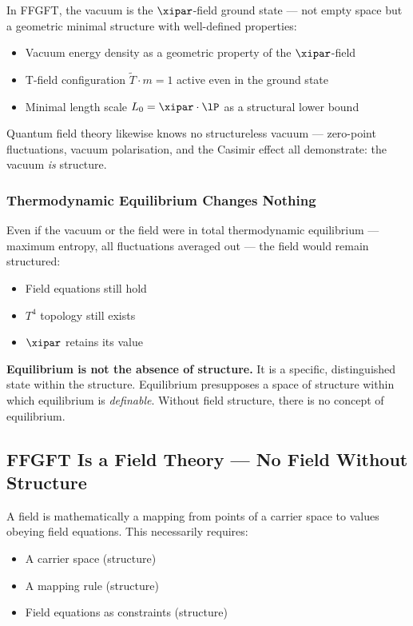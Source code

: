 In FFGFT, the vacuum is the $\xipar$-field ground state --- not empty space but a geometric minimal structure with well-defined properties:
\begin{itemize}
  \item Vacuum energy density as a geometric property of the $\xipar$-field
  \item T-field configuration $\tilde{T} \cdot m = 1$ active even in the ground state
  \item Minimal length scale $L_0 = \xipar \cdot \lP$ as a structural lower bound
\end{itemize}

Quantum field theory likewise knows no structureless vacuum --- zero-point fluctuations, vacuum polarisation, and the Casimir effect all demonstrate: the vacuum \emph{is} structure.

\subsubsection{Thermodynamic Equilibrium Changes Nothing}

Even if the vacuum or the field were in total thermodynamic equilibrium --- maximum entropy, all fluctuations averaged out --- the field would remain structured:
\begin{itemize}
  \item Field equations still hold
  \item $T^4$ topology still exists
  \item $\xipar$ retains its value
\end{itemize}

\begin{wichtig}
\textbf{Equilibrium is not the absence of structure.} It is a specific, distinguished state within the structure. Equilibrium presupposes a space of structure within which equilibrium is \emph{definable}. Without field structure, there is no concept of equilibrium.
\end{wichtig}

\subsection{FFGFT Is a Field Theory --- No Field Without Structure}

A field is mathematically a mapping from points of a carrier space to values obeying field equations. This necessarily requires:
\begin{itemize}
  \item A carrier space (structure)
  \item A mapping rule (structure)
  \item Field equations as constraints (structure)
\end{itemize}

